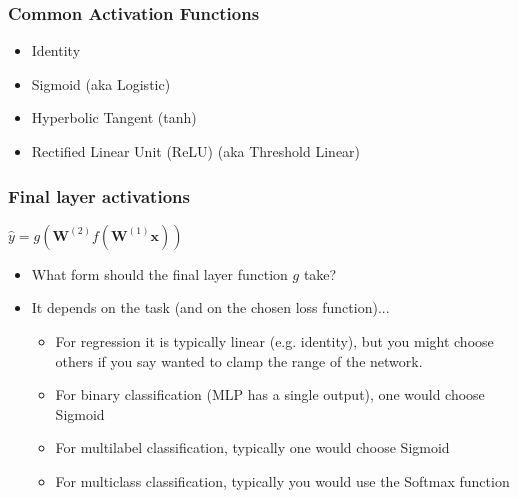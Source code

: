 \documentclass[\beamerclass]{beamer}
\begin{document}
\begin{frame}[fragile]\frametitle{Common Activation Functions}

\begin{itemize}
  \item Identity
  \item Sigmoid (aka Logistic)
  \item Hyperbolic Tangent (tanh)
  \item Rectified Linear Unit (ReLU) (aka Threshold Linear)
\end{itemize}

\end{frame}

\begin{frame}[fragile]\frametitle{Final layer activations}

\begin{center}
    $\hat y = g(\bm{W}^{(2)} f(\bm{W}^{(1)} \bm x))$\\
\end{center}

\begin{itemize}
  \item<+-> What form should the final layer function $g$ take? 
  \item<+-> It depends on the task (and on the chosen loss function)...
  \begin{itemize}
    \item For regression it is typically linear (e.g. identity), but you might choose others if you say wanted to clamp the range of the network.
    \item For binary classification (MLP has a single output), one would choose Sigmoid
    \item For multilabel classification, typically one would choose Sigmoid
    \item For multiclass classification, typically you would use the Softmax function
  \end{itemize}
\end{itemize}
\end{frame}

\end{document}
